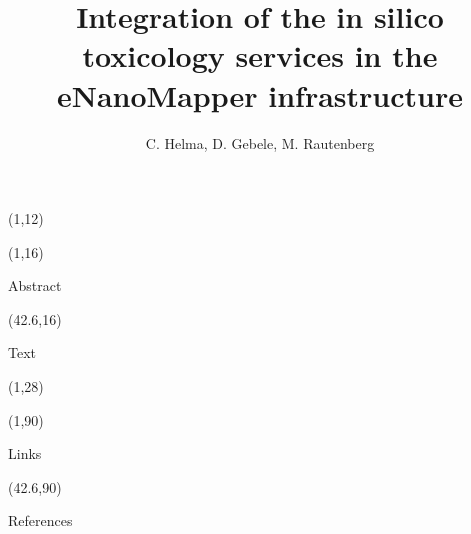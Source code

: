 \documentclass[final]{beamer}
\title{Integration of the in silico toxicology services in the eNanoMapper infrastructure }
\author{C. Helma, D. Gebele, M. Rautenberg}
\institute{\emph{in silico} toxicology gmbh, Basel, Switzerland}
\begin{document}
  \begin{frame}{}

    \begin{textblock}{80}(1,12)
        
    \end{textblock}

    \begin{textblock}{40.5}(1,16)
      \begin{block}{Abstract}
        
      \end{block}

    \end{textblock}

    \begin{textblock}{40.5}(42.6,16)

      \begin{block}{Text}
        
      \end{block}

    \end{textblock}



    \begin{textblock}{82.1}(1,28)
      
    \end{textblock}

    \begin{textblock}{40.5}(1,90)

      \begin{exampleblock}{Links}
        
      \end{exampleblock}

    \end{textblock}

    \begin{textblock}{40.5}(42.6,90)

      \begin{block}{References}
        \small
      \end{block}

    \end{textblock}


  \end{frame}
\end{document}
